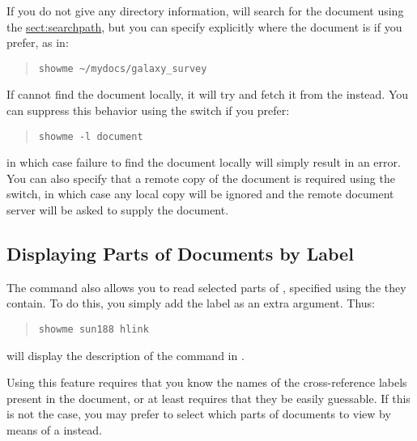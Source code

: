 If you do not give any directory information,  will search
for the document using the \hyperref{\hi{HTX\_PATH} search
path}{\hi{HTX\_PATH} search path (see \S}{)}{sect:searchpath}, but you
can specify explicitly where the document is if you prefer, as in:

\begin{quote}
\begin{verbatim}
showme ~/mydocs/galaxy_survey
\end{verbatim}
\end{quote}

If  cannot find the document locally, it will try and fetch
it from the 
instead.
You can suppress this behavior using the  switch if you prefer:

\begin{quote}
\begin{verbatim}
showme -l document
\end{verbatim}
\end{quote}

in which case failure to find the document locally will simply result
in an error. You can also specify that a remote copy of the document
is required using the  switch, in which case any local copy
will be ignored and the remote document server will be asked to supply
the document.

\subsection{Displaying Parts of Documents by Label}

The  command also allows you to read selected
parts of , specified using
the  they
contain.
To do this, you simply add the label as an extra argument. Thus:

\begin{quote}
\begin{verbatim}
showme sun188 hlink
\end{verbatim}
\end{quote}

will display the description of the 
command in .

Using this feature requires that you know the names of the
cross-reference labels present in the document, or at least requires
that they be easily guessable. If this is not the case, you may prefer
to select which parts of documents to view by means of a
instead.

